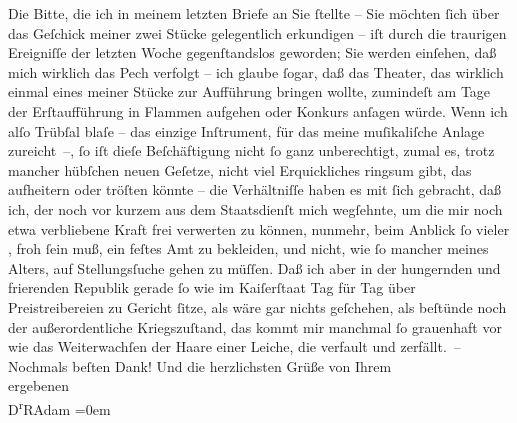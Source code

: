 \begin{ledgroupsized}[t]{13cm}
           \pstart
           Die Bitte, die ich in meinem letzten Briefe an Sie ſtellte – Sie möchten ſich über
               das Geſchick meiner zwei Stücke gelegentlich erkundigen – iſt durch die traurigen Ereigniſſe der
               letzten Woche gegenſtandslos geworden; Sie werden einſehen, daß mich wirklich das
               Pech verfolgt – ich glaube ſogar, daß das Theater, das wirklich einmal eines meiner
               Stücke zur Aufführung bringen wollte, zumindeſt am Tage der Erſtaufführung in Flammen
               aufgehen oder Konkurs anſagen würde. Wenn ich alſo Trübſal blaſe – das einzige
               Inſtrument, für das meine muſikaliſche Anlage zureicht –, ſo iſt dieſe Beſchäftigung
               nicht ſo ganz unberechtigt, zumal es, trotz mancher hübſchen neuen Geſetze, nicht
               viel Erquickliches ringsum gibt, das aufheitern oder tröſten könnte – die
               Verhältniſſe haben es mit ſich gebracht, daß ich, der noch vor kurzem aus dem
               Staatsdienſt mich wegſehnte, um die mir noch etwa verbliebene Kraft frei verwerten zu
               können, nunmehr, beim Anblick ſo vieler \label{K_L02315-1v}\label{K_L02315-1h}, froh ſein muß, ein feſtes Amt zu bekleiden, und nicht, wie ſo
               mancher meines Alters, auf Stel{\pb}lungsſuche
               gehen zu müſſen. Daß ich aber in der hungernden und frierenden Republik gerade ſo wie im Kaiſerſtaat Tag
               für Tag über Preistreibereien zu Gericht ſitze, als wäre gar nichts geſchehen, als
               beſtünde noch der außerordentliche Kriegszuſtand, das kommt mir manchmal ſo
               grauenhaft vor wie das Weiterwachſen der Haare einer Leiche, die verfault und
               zerfällt. –\pend
           \pstart
           Nochmals beſten Dank! Und die herzlichsten Grüße von Ihrem{\\[\baselineskip]}ergebenen{\\[\baselineskip]}\spacefill\mbox{D\textsuperscript{r}RAdam}\pend
           \leftskip=0em{}
         
         \endnumbering{}\end{ledgroupsized}  \newcommand{\dateiname}{L02315}\newcommand{\titel}{Robert Adam an Arthur Schnitzler, 8. 12. 1918}\newcommand{\editorInnen}{Martin Anton Müller und Gerd-Hermann Susen}
      